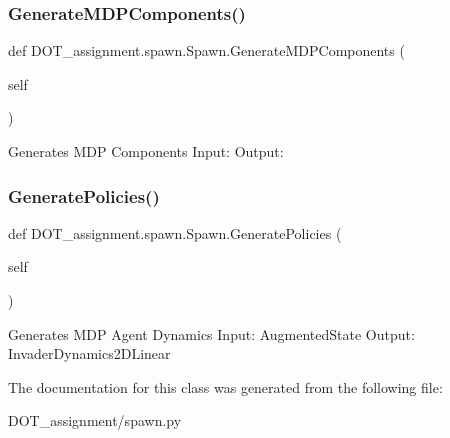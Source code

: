 \subsubsection{\texorpdfstring{GenerateMDPComponents()}{GenerateMDPComponents()}}
{\footnotesize\ttfamily def D\+O\+T\+\_\+assignment.\+spawn.\+Spawn.\+Generate\+M\+D\+P\+Components (\begin{DoxyParamCaption}\item[{}]{self }\end{DoxyParamCaption})}

\begin{DoxyVerb}Generates MDP Components
Input:
Output:
\end{DoxyVerb}
 \mbox{\label{class_d_o_t__assignment_1_1spawn_1_1_spawn_a889cfc54fa6b539c9d393e1b5df76810}} 
\subsubsection{\texorpdfstring{GeneratePolicies()}{GeneratePolicies()}}
{\footnotesize\ttfamily def D\+O\+T\+\_\+assignment.\+spawn.\+Spawn.\+Generate\+Policies (\begin{DoxyParamCaption}\item[{}]{self }\end{DoxyParamCaption})}

\begin{DoxyVerb}Generates MDP Agent Dynamics
Input: AugmentedState
Output: InvaderDynamics2DLinear
\end{DoxyVerb}
 

The documentation for this class was generated from the following file\+:\begin{DoxyCompactItemize}
\item 
D\+O\+T\+\_\+assignment/spawn.\+py\end{DoxyCompactItemize}
